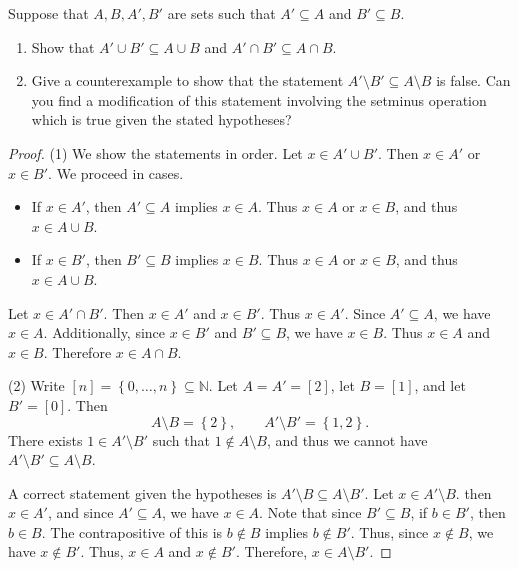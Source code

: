 \documentclass[11pt, letterpaper]{article}
\begin{document}
\begin{problem}
	Suppose that $A,B,A',B'$ are sets such that $A'\subseteq A$ and $B'\subseteq B$.
	\begin{enumerate}[label=(\arabic*)]
		\item Show that $A' \cup B'\subseteq A \cup B$ and $A' \cap B' \subseteq A \cap B$.
		\item Give a counterexample to show that the statement $A'\setminus B' \subseteq A\setminus B$ is false. Can you find a modification of this statement involving the setminus operation which is true given the stated hypotheses?
	\end{enumerate}
\end{problem}
\begin{proof}
	(1) We show the statements in order. Let $x\in A' \cup B'$. Then $x\in A'$ or $x\in B'$. We proceed in cases.
	\begin{itemize}
		\item If $x\in A'$, then $A'\subseteq A$ implies $x\in A$. Thus $x\in A $ or $x\in B$, and thus $x\in A \cup B$.
		\item If $x\in B'$, then $B'\subseteq B$ implies $x\in B$. Thus $x\in A$ or $x\in B$, and thus $x\in A \cup B$.
	\end{itemize}
	
	Let $x\in A' \cap B'$. Then $x\in A'$ and $x\in B'$. Thus $x\in A'$. Since $A'\subseteq A$, we have $x\in A$. Additionally, since $x\in B'$ and $B'\subseteq B$, we have $x\in B$. Thus $x\in A$ and $x\in B$. Therefore $x\in A \cap B$.

	(2) Write $[n]=\left\{ 0, \ldots , n \right\}\subseteq \mathbb{N} $. Let $A=A'=[2]$, let $B=[1]$, and let $B'=[0]$. Then
	\[
		A\setminus B = \left\{ 2 \right\} ,\qquad A'\setminus B' = \left\{ 1,2 \right\} 
	.\]
	There exists $1\in A'\setminus B'$ such that $1\notin A\setminus B$, and thus we cannot have $A'\setminus B'\subseteq A\setminus B$.

	A correct statement given the hypotheses is $A'\setminus B \subseteq A\setminus B'$. Let $x\in A'\setminus B$. then $x\in A'$, and since $A'\subseteq A$, we have $x\in A$. Note that since $B'\subseteq B$, if $b\in B'$, then $b\in B$. The contrapositive of this is $b \notin B$ implies $b\notin B'$. Thus, since $x\notin B$, we have $x\notin B'$. Thus, $x\in A$ and $x\notin B'$. Therefore, $x\in A\setminus B'$.
\end{proof}
\end{document}
